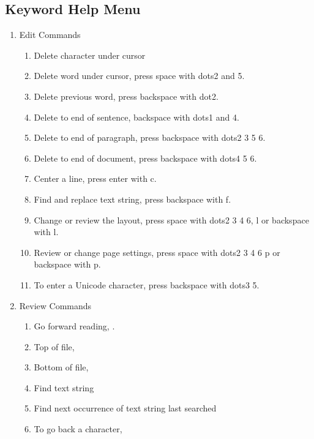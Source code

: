 \documentclass[10pt,letterpaper,twoside]{report}
\begin{document}
{{{\subsection{Keyword Help Menu}
\begin{enumerate}
	\item Edit Commands
		\begin{enumerate}
			\item Delete character under cursor  
			\item Delete word under cursor, press space with dots2 and 5.
			\item Delete previous word, press backspace with dot2.
			\item Delete to end of sentence, backspace with dots1 and 4.
			\item Delete to end of paragraph, press backspace with dots2 3 5 6.
			\item Delete to end of document, press backspace with dots4 5 6.
			\item Center a line, press enter with c.
			\item Find and replace text string, press backspace with f.
			\item Change or review the layout, press space with dots2 3 4 6, l or backspace with l.
			\item Review or change page settings, press space with dots2 3 4 6 p or backspace with p.
			\item To enter a Unicode character, press backspace with dots3 5.
		\end{enumerate}
	\item Review Commands
		\begin{enumerate}
			\item Go forward reading,   .
			\item Top of file,   
			\item Bottom of file, 
			\item Find text string 
			\item Find next occurrence of text string last searched 
			\item To go back a character, 

\end{enumerate}
\end{enumerate}}}}
\end{document}
